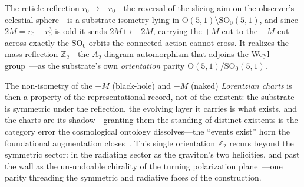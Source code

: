\documentclass[11pt,a4paper]{article}
\theoremstyle{plain}
\theoremstyle{definition}
\theoremstyle{remark}
\begin{document}
The reticle reflection $r_0\mapsto-r_0$---the reversal of the slicing aim on the observer's celestial sphere---is a substrate isometry lying in $\mathrm{O}(5,1)\setminus\mathrm{SO}_0(5,1)$, and since $2M=r_0-r_0^3$ is odd it sends $2M\mapsto-2M$, carrying the $+M$ cut to the $-M$ cut across exactly the $\mathrm{SO}_0$-orbits the connected action cannot cross. It realizes the mass-reflection $\mathbb{Z}_2$---the $A_2$ diagram automorphism that adjoins the Weyl group~\cite{JanzenGroupoid}---as the substrate's own \emph{orientation} parity $\mathrm{O}(5,1)/\mathrm{SO}_0(5,1)$. 

The non-isometry of the $+M$ (black-hole) and $-M$ (naked) \emph{Lorentzian charts} is then a property of the representational record, not of the existent: the substrate is symmetric under the reflection, the evolving layer it carries is what exists, and the charts are its shadow---granting them the standing of distinct existents is the category error the cosmological ontology dissolves---the ``events exist'' horn the foundational augmentation closes~\cite{JanzenModernParallax,JanzenCanonicalTime,JanzenBHcausality}. This single orientation $\mathbb{Z}_2$ recurs beyond the symmetric sector: in the radiating sector as the graviton's two helicities, and past the wall as the un-undoable chirality of the turning polarization plane~\cite{JanzenRange,JanzenDynamics}---one parity threading the symmetric and radiative faces of the construction. 
\end{document}

